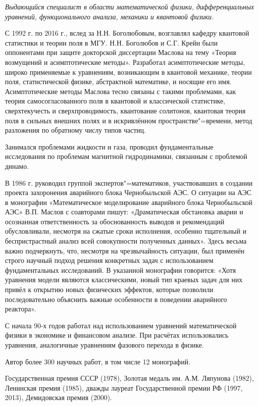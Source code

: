 {\it Выдающийся специалист в области математической физики, дифференциальных уравнений, функционального анализа, механики и квантовой физики.

С 1992 г. по 2016 г., вслед за Н.Н. Боголюбовым, возглавлял кафедру квантовой статистики и теории поля в МГУ.  Н.Н. Боголюбов и С.Г. Крейн были оппонентами при защите докторской диссертации Маслова на тему «Теория возмущений и асимптотические методы». Разработал асимптотические методы, широко применяемые к уравнениям, возникающим в квантовой механике, теории поля, статистической физике, абстрактной математике, и носящие его имя. Асимптотические методы Маслова тесно связаны с такими проблемами, как теория самосогласованного поля в квантовой и классической статистике, сверхтекучесть и сверхпроводимость, квантование солитонов, квантовая теория поля в сильных внешних полях и в искривлённом пространстве"=времени, метод разложения по обратному числу типов частиц.

Занимался проблемами жидкости и газа, проводил фундаментальные исследования по проблемам магнитной гидродинамики, связанным с проблемой динамо.

В 1986 г. руководил группой экспертов"=математиков, участвовавших в создании проекта захоронения аварийного блока Чернобыльской АЭС. О ситуации на АЭС в монографии «Математическое моделирование аварийного блока Чернобыльской АЭС» В.П. Маслов с соавторами пишут: «Драматическая обстановка аварии и осознанная ответственность за обоснованность выводов и рекомендаций обусловливали, несмотря на сжатые сроки исполнения, особенно тщательный и беспристрастный анализ всей совокупности полученных данных». Здесь весьма важно подчеркнуть, что, несмотря на чрезвычайность ситуации, был применён строго научный подход решения конкретных задач с использованием фундаментальных исследований.  В указанной монографии говорится: «Хотя уравнения модели являются классическими, новый тип краевых задач для них привёл к открытию новых физических эффектов, которые позволили последовательно объяснить важные особенности в поведении аварийного реактора».

С начала 90-х годов работал над использованием уравнений математической физики в экономике и финансовом анализе. При расчётах использовались уравнения, аналогичные уравнениям фазового перехода в физике.

Автор более 300 научных работ, в том числе 12 монографий.

Государственная премия СССР (1978), Золотая медаль им. А.М. Ляпунова (1982), Ленинская премия (1985), дважды лауреат Государственной премии РФ (1997, 2013), Демидовская премия (2000).}

